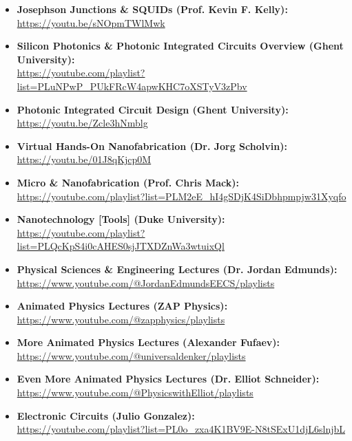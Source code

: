 \begin{itemize}
  \item\textbf{Josephson Junctions \& SQUIDs (Prof. Kevin F. Kelly):}\\
\url{https://youtu.be/sNOpmTWlMwk}

  \item\textbf{Silicon Photonics \& Photonic Integrated Circuits Overview (Ghent University):}\\
\url{https://youtube.com/playlist?list=PLuNPwP_PUkFRcW4apwKHC7oXSTyV3zPbv}\\

  \item\textbf{Photonic Integrated Circuit Design (Ghent University):}\\
\url{https://youtu.be/Zcle3hNmblg}

  \item\textbf{Virtual Hands-On Nanofabrication (Dr. Jorg Scholvin):}\\
\url{https://youtu.be/01J8qKjcp0M}

  \item\textbf{Micro \& Nanofabrication (Prof. Chris Mack):}\\
\url{https://youtube.com/playlist?list=PLM2eE_hI4gSDjK4SiDbhpmpjw31Xyqfo}

  \item\textbf{Nanotechnology [Tools] (Duke University):}\\
\url{https://youtube.com/playlist?list=PLQcKpS4i0cAHES0sjJTXDZnWa3wtuixQl}

  \item\textbf{Physical Sciences \& Engineering Lectures (Dr. Jordan Edmunds):}\\
\url{https://www.youtube.com/@JordanEdmundsEECS/playlists}

  \item\textbf{Animated Physics Lectures (ZAP Physics):}\\
\url{https://www.youtube.com/@zapphysics/playlists}

  \item\textbf{More Animated Physics Lectures (Alexander Fufaev):}\\
\url{https://www.youtube.com/@universaldenker/playlists}

  \item\textbf{Even More Animated Physics Lectures (Dr. Elliot Schneider):}\\
\url{https://www.youtube.com/@PhysicswithElliot/playlists}

  \item\textbf{Electronic Circuits (Julio Gonzalez):}\\
\url{https://youtube.com/playlist?list=PL0o_zxa4K1BV9E-N8tSExU1djL6slnjbL}\\

\end{itemize}
